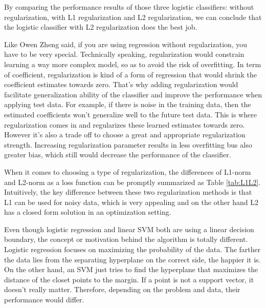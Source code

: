 \documentclass[11pt]{article}
\begin{document}
\bigbreak

By comparing the performance results of those three logistic classifiers: without regularization, with L1 regularization and L2 regularization, we can conclude that the logistic classifier with L2 regularization does the best job.

\bigbreak

Like Owen Zheng said, if you are using regression without regularization, you have to be very special. Technically speaking, regularization would constrain learning a way more complex model, so as to avoid the risk of overfitting. In term of coefficient,  regularization is kind of a form of regression that would shrink the coefficient estimates towards zero. That's why adding regularization would facilitate generalization ability of the classifier and improve the performance when applying test data. For example, if there is noise in the training data, then the estimated coefficients won't generalize well to the future test data. This is where regularization comes in and regularizes these learned estimates towards zero. However it's also a trade off to choose a great and appropriate regularization strength. Increasing regularization parameter results in less overfitting bus also greater bias, which still would decrease the performance of the classifier.

\bigbreak

When it comes to choosing a type of regularization, the differences of L1-norm and L2-norm as a loss function can be promptly summarized as Table \ref{tab:L1L2}. Intuitively, the key difference between these two regularization methods is that L1 can be used for noisy data, which is very appealing and on the other hand L2 has a closed form solution in an optimization setting.

\bigbreak

Even though logistic regression and linear SVM both are using a linear decision boundary, the concept or motivation behind the algorithm is totally different. Logistic regression focuses on maximizing the probability of the data. The farther the data lies from the separating hyperplane on the correct side, the happier it is. On the other hand, an SVM just tries to find the hyperplane that maximizes the distance of the closet points to the margin. If a point is not a support vector, it doesn't really matter. Therefore, depending on the problem and data, their performance would differ.

\begin{table}[h]
\center
\caption{Comparison between L1 and L2 regularization}
\label{tab:L1L2}
\end{table}
\end{document}
